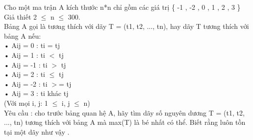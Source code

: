 Cho một ma trận A kích thước n*n chỉ gồm các giá trị \{ -1 , -2 , 0 , 1 , 2 , 3 \}   
\\   Giả thiết 2  $\le$  n  $\le$  300.   
\\   Bảng A gọi là tương thích với dãy T = (t1, t2, ..., tn), hay dãy T tương thích với bảng A nếu:   
\\   • Aij = 0  :   ti = tj   
\\   • Aij = 1  :   ti $<$ tj   
\\   • Aij = -1 :   ti $>$ tj   
\\   • Aij = 2  :  ti  $\le$  tj   
\\   • Aij = -2 :   ti $>$= tj   
\\   • Aij = 3  :   ti khác tj   
\\   (Với mọi i, j: 1  $\le$  i, j  $\le$  n)   
\\   Yêu cầu : cho trước bảng quan hệ A, hãy tìm dãy số nguyên dương T = (t1, t2, ..., tn) tương thích với bảng A mà max(T) là bé nhất có thể. Biết rằng luôn tồn tại một dãy như vậy .  

\